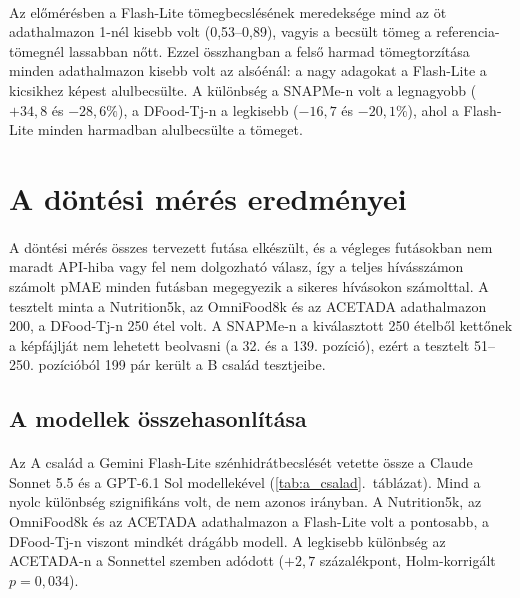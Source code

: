 \paragraph{}Az előmérésben a Flash-Lite tömegbecslésének meredeksége mind az öt adathalmazon 
1-nél kisebb volt (0,53--0,89), vagyis a becsült tömeg a referencia-tömegnél lassabban nőtt. Ezzel összhangban a felső harmad tömegtorzítása minden adathalmazon 
kisebb volt az alsóénál: a nagy adagokat a Flash-Lite a kicsikhez képest alulbecsülte. A 
különbség a SNAPMe-n volt a legnagyobb ($+34{,}8$ és $-28{,}6\%$), a DFood-Tj-n a legkisebb 
($-16{,}7$ és $-20{,}1\%$), ahol a Flash-Lite minden harmadban alulbecsülte a tömeget.


\section{A döntési mérés eredményei}
\label{sec:dontesi_eredmenyek}
\paragraph{}A döntési mérés összes tervezett futása elkészült, és a végleges futásokban nem 
maradt API-hiba vagy fel nem dolgozható válasz, így a teljes hívásszámon számolt pMAE 
minden futásban megegyezik a sikeres hívásokon számolttal.
A tesztelt minta a Nutrition5k, az OmniFood8k és az ACETADA adathalmazon 200, a DFood-Tj-n 250 étel volt. 
A SNAPMe-n a kiválasztott 250 ételből kettőnek a képfájlját nem lehetett beolvasni (a 32. és 
a 139. pozíció), ezért a tesztelt 51--250. pozícióból 199 pár került a B család tesztjeibe.

\subsection{A modellek összehasonlítása}
\paragraph{}Az A család a Gemini Flash-Lite szénhidrátbecslését 
vetette össze a Claude Sonnet 5.5 és a GPT-6.1 Sol modellekével 
(\ref{tab:a_csalad}.~táblázat). Mind a nyolc különbség szignifikáns volt, 
de nem azonos irányban. A Nutrition5k, az OmniFood8k és az ACETADA adathalmazon 
a Flash-Lite volt a pontosabb, a DFood-Tj-n viszont mindkét drágább modell. 
A legkisebb különbség az ACETADA-n a Sonnettel szemben adódott ($+2{,}7$ százalékpont, Holm-korrigált $p = 0{,}034$).

